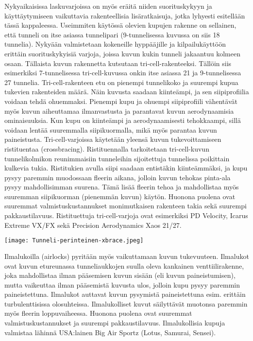 Nykyaikaisissa laskuvarjoissa on myös eräitä niiden suorituskykyyn ja käyttäytymiseen vaikuttavia rakenteellisia lisäratkaisuja, jotka lyhyesti esitellään tässä kappaleessa. Useimmiten käytössä olevien kupujen rakenne on sellainen, että tunneli on itse asiassa tunnelipari (9-tunnelisessa kuvussa on siis 18 tunnelia). Nykyään valmistetaan kokeneille hyppääjille ja kilpailukäyttöön erittäin suorituskykyisiä varjoja, joissa kuvun kukin tunneli jakaantuu kolmeen osaan. Tällaista kuvun rakennetta kutsutaan tri-cell-rakenteeksi. Tällöin siis esimerkiksi 7-tunnelisessa tri-cell-kuvussa onkin itse asiassa 21 ja 9-tunnelisessa 27 tunnelia. Tri-cell-rakenteen etu on pienempi tunnelikoko ja suurempi kupua tukevien rakenteiden määrä. Näin kuvusta saadaan kiinteämpi, ja sen siipiprofiilia voidaan tehdä ohuemmaksi. Pienempi kupu ja ohuempi siipiprofiili vähentävät myös kuvun aiheuttamaa ilmanvastusta ja parantavat kuvun aerodynaamisia ominaisuuksia. Kun kupu on kiinteämpi ja aerodynaamisesti tehokkaampi, sillä voidaan lentää suuremmalla siipikuormalla, mikä myös parantaa kuvun paineistusta. Tri-cell-varjoissa käytetään yleensä kuvun tukevoittamiseen ristituentaa (crossbracing). Ristituennalla tarkoitetaan tri-cell-kuvun tunnelikolmikon reunimmaisiin tunneleihin sijoitettuja tunnelissa poikittain kulkevia tukia. Ristitukien avulla siipi saadaan entistäkin kiinteämmäksi, ja kupu pysyy paremmin muodossaan fleerin aikana, jolloin kuvun tehokas pinta-ala pysyy mahdollisimman suurena. Tämä lisää fleerin tehoa ja mahdollistaa myös suuremman siipikuorman (pienemmän kuvun) käytön. Huonona puolena ovat suuremmat valmistuskustannukset monimutkaisen rakenteen takia sekä suurempi pakkaustilavuus. Ristituettuja tri-cell-varjoja ovat esimerkiksi PD Velocity, Icarus Extreme VX/FX sekä Precision Aerodynamics Xaos 21/27. 


\begin{Figure}\centering\texttt{[image: Tunneli-perinteinen-xbrace.jpeg]}\end{Figure} 


Ilmalukoilla (airlocks) pyritään myös vaikuttamaan kuvun tukevuuteen. Ilmalukot ovat kuvun etureunassa tunneliaukkojen suulla oleva kankainen venttiilirakenne, joka mahdollistaa ilman pääsemisen kuvun sisään (eli kuvun paineistumisen), mutta vaikeuttaa ilman pääsemistä kuvusta ulos, jolloin kupu pysyy paremmin paineistettuna. Ilmalukot auttavat kuvun pysymistä paineistettuna esim. erittäin turbulenttisissa olosuhteissa. Ilmalukolliset kuvut säilyttävät muotonsa paremmin myös fleerin loppuvaiheessa. Huonona puolena ovat suuremmat valmistuskustannukset ja suurempi pakkaustilavuus. Ilmalukollisia kupuja valmistaa lähinnä USA:lainen Big Air Sportz (Lotus, Samurai, Sensei). 

